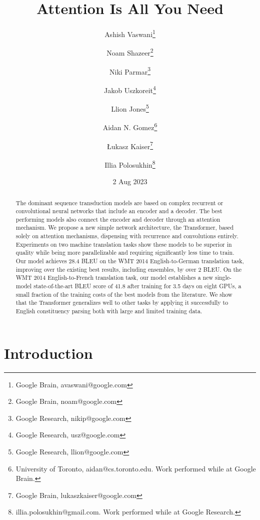 \documentclass[12pt, a4paper]{article}
\title{Attention Is All You Need}
\author{Ashish Vaswani\thanks{Google Brain, avaswani@google.com} \and Noam Shazeer\thanks{Google Brain, noam@google.com} \and Niki Parmar\thanks{Google Research, nikip@google.com} \and Jakob Uszkoreit\thanks{Google Research, usz@google.com} \and Llion Jones\thanks{Google Research, llion@google.com} \and Aidan N. Gomez\thanks{University of Toronto, aidan@cs.toronto.edu. Work performed while at Google Brain.} \and Łukasz Kaiser\thanks{Google Brain, lukaszkaiser@google.com} \and Illia Polosukhin\thanks{illia.polosukhin@gmail.com. Work performed while at Google Research.}}
\date{2 Aug 2023}
\begin{document}
\maketitle


\begin{abstract}
The dominant sequence transduction models are based on complex recurrent or convolutional neural networks that include an encoder and a decoder. The best performing models also connect the encoder and decoder through an attention mechanism. We propose a new simple network architecture, the Transformer, based solely on attention mechanisms, dispensing with recurrence and convolutions entirely. Experiments on two machine translation tasks show these models to be superior in quality while being more parallelizable and requiring significantly less time to train. Our model achieves 28.4 BLEU on the WMT 2014 English-to-German translation task, improving over the existing best results, including ensembles, by over 2 BLEU. On the WMT 2014 English-to-French translation task, our model establishes a new single-model state-of-the-art BLEU score of 41.8 after training for 3.5 days on eight GPUs, a small fraction of the training costs of the best models from the literature. We show that the Transformer generalizes well to other tasks by applying it successfully to English constituency parsing both with large and limited training data.
\end{abstract}

\section{Introduction}
\end{document}
